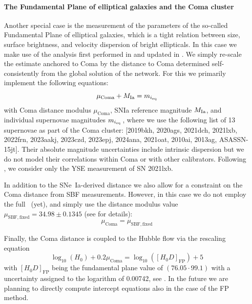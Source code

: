 \paragraph {The Fundamental Plane of elliptical galaxies and the Coma cluster\label{sec:eq_special:FP}}
Another special case is the measurement of the parameters of the so-called Fundamental Plane of elliptical galaxies, which is a tight relation between size, surface brightness, and velocity dispersion of bright ellipticals. In this case we make use of the analysis first performed in \citet{2025MNRAS.539.3627S} and updated in \citet{2025ApJ...979L...9S}. We simply re-scale the estimate anchored to Coma by the distance to Coma determined self-consistently from the global solution of the network. For this we primarily implement the following equations:
\begin{equation}
    \mu_\mathrm{Coma} + M_{\rm Ia} = m_\ieq
\end{equation}
with Coma distance modulus $\mu_\mathrm{Coma}$, SNIa reference magnitude $M_{\rm Ia}$, and individual supernovae magnitudes $m_{i_{\rm eq}}$\,, where we use the following list of 13 supernovae as part of the Coma cluster: [2019bkh, 2020ags, 2021dch, 2021lxb, 2022frn, 2023aakj, 2023czd, 2023epj, 2024ana, 2021oat, 2010ai, 2013ag, ASASSN-15jt]. Their absolute magnitude uncertainties include intrinsic dispersion but we do not model their correlations within Coma or with other calibrators.  Following \citet{2025MNRAS.539.3627S}, we consider only the YSE measurement of SN 2021lxb.

In addition to the SNe~Ia-derived distance we also allow for a constraint on the Coma distance from SBF measurements. However, in this case we do not employ the full \DN\ (yet), and simply use the distance modulus value $\mu_\mathrm{SBF, fixed} = 34.98\pm 0.1345$ (see  \citet{2025MNRAS.539.3627S,2025ApJ...979L...9S} for details):  
\begin{equation}
    \mu_\mathrm{Coma} = \mu_\mathrm{SBF, fixed}
\end{equation}

Finally, the Coma distance is coupled to the Hubble flow via the rescaling equation
\begin{equation}
    \log_{10}(H_0) + 0.2 \mu_\mathrm{Coma} = \log_{10}([H_0D]_\mathrm{FP}) + 5
\end{equation}
with $[H_0D]_\mathrm{FP}$ being the fundamental plane value of $(76.05 \cdot 99.1)$ with a uncertainty assigned to the logarithm of 0.00742, see \citet{2025MNRAS.539.3627S,2025ApJ...979L...9S}. In the future we are planning to directly compute intercept equations also in the case of the FP method.

